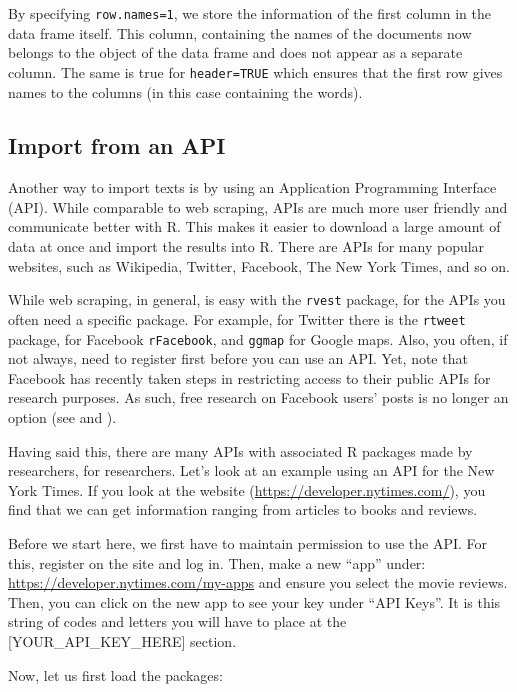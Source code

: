 \documentclass[
]{article}
\begin{document}
By specifying \texttt{row.names=1}, we store the information of the first column in the data frame itself. This column, containing the names of the documents now belongs to the object of the data frame and does not appear as a separate column. The same is true for \texttt{header=TRUE} which ensures that the first row gives names to the columns (in this case containing the words).

\hypertarget{import-from-an-api}{%
\subsection{Import from an API}\label{import-from-an-api}}

Another way to import texts is by using an Application Programming Interface (API). While comparable to web scraping, APIs are much more user friendly and communicate better with R. This makes it easier to download a large amount of data at once and import the results into R. There are APIs for many popular websites, such as Wikipedia, Twitter, Facebook, The New York Times, and so on.

While web scraping, in general, is easy with the \texttt{rvest} package, for the APIs you often need a specific package. For example, for Twitter there is the \texttt{rtweet} package, for Facebook \texttt{rFacebook}, and \texttt{ggmap} for Google maps. Also, you often, if not always, need to register first before you can use an API. Yet, note that Facebook has recently taken steps in restricting access to their public APIs for research purposes. As such, free research on Facebook users' posts is no longer an option (see \textcite{Freelon2018a} and \textcite{Perriam2020a}).

Having said this, there are many APIs with associated R packages made by researchers, for researchers. Let's look at an example using an API for the New York Times. If you look at the website (\url{https://developer.nytimes.com/}), you find that we can get information ranging from articles to books and reviews.

Before we start here, we first have to maintain permission to use the API. For this, register on the site and log in. Then, make a new ``app'' under: \url{https://developer.nytimes.com/my-apps} and ensure you select the movie reviews. Then, you can click on the new app to see your key under ``API Keys''. It is this string of codes and letters you will have to place at the {[}YOUR\_API\_KEY\_HERE{]} section.

Now, let us first load the packages:
\end{document}
